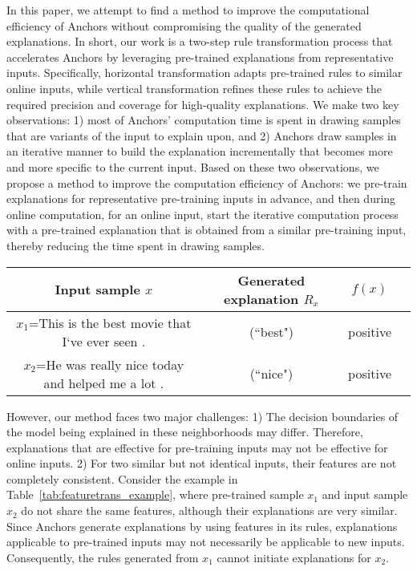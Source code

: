 In this paper, we attempt to find a method to improve the computational efficiency of Anchors without compromising the quality of the generated explanations. 
%
In short, our work is a two-step rule transformation process that accelerates Anchors by leveraging pre-trained explanations from representative inputs. Specifically, horizontal transformation adapts pre-trained rules to similar online inputs, while vertical transformation refines these rules to achieve the required precision and coverage for high-quality explanations.
%
We make two key observations: 1) most of Anchors' computation time is spent in drawing samples that are variants of the input to explain upon, and 2) Anchors draw samples in an iterative manner to build the explanation incrementally that becomes more and more specific to the current input.
%
Based on these two observations, we propose a method to improve the computation efficiency of Anchors: we pre-train explanations for representative pre-training inputs in advance, and then during online computation, for an online input, start the iterative computation process with a pre-trained explanation that is obtained from a similar pre-training input, thereby reducing the time spent in drawing samples.
%

\begin{table*}[h]
    \small
    \centering
    \caption{The sampling process with different features.}
    \label{tab:featuretrans_example}
    \begin{tabular}{cccc}
        \toprule 
        Input sample $x$ & Generated explanation $R_x$ & $f(x)$ \\
        \midrule
        $x_1$=This is the best movie that I‘ve ever seen .& (``best") & positive\\
        $x_2$=He was really nice today and helped me a lot .& (``nice") & positive\\
        \bottomrule
    \end{tabular}
\end{table*}

However, our method faces two major challenges: 1) The decision boundaries of the model being explained in these neighborhoods may differ. Therefore, explanations that are effective for pre-training inputs may not be effective for online inputs. 2) For two similar but not identical inputs, their features are not completely consistent. Consider the example in Table~\ref{tab:featuretrans_example}, where pre-trained sample $x_1$ and input sample $x_2$ do not share the same features, although their explanations are very similar. Since Anchors generate explanations by using features in its rules, explanations applicable to pre-trained inputs may not necessarily be applicable to new inputs. Consequently, the rules generated from $x_1$ cannot initiate explanations for $x_2$. 

